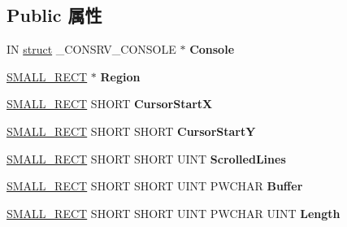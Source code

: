 \subsection*{Public 属性}
\begin{DoxyCompactItemize}
\item 
\mbox{\label{struct___f_r_o_n_t_e_n_d___v_t_b_l_aa908ac78a751065e23319e1109936856}} 
IN \hyperlink{interfacestruct}{struct} \+\_\+\+C\+O\+N\+S\+R\+V\+\_\+\+C\+O\+N\+S\+O\+LE $\ast$ {\bfseries Console}
\item 
\mbox{\label{struct___f_r_o_n_t_e_n_d___v_t_b_l_a7b7aa07ecf32b4bb2c6b5b0b5be18f39}} 
\hyperlink{structtag_s_m_a_l_l___r_e_c_t}{S\+M\+A\+L\+L\+\_\+\+R\+E\+CT} $\ast$ {\bfseries Region}
\item 
\mbox{\label{struct___f_r_o_n_t_e_n_d___v_t_b_l_af52ef7cd42e629e3d2b0e1985ceedd9b}} 
\hyperlink{structtag_s_m_a_l_l___r_e_c_t}{S\+M\+A\+L\+L\+\_\+\+R\+E\+CT} S\+H\+O\+RT {\bfseries Cursor\+StartX}
\item 
\mbox{\label{struct___f_r_o_n_t_e_n_d___v_t_b_l_ab8c4c69ddadcda0d1d1e006aee178dda}} 
\hyperlink{structtag_s_m_a_l_l___r_e_c_t}{S\+M\+A\+L\+L\+\_\+\+R\+E\+CT} S\+H\+O\+RT S\+H\+O\+RT {\bfseries Cursor\+StartY}
\item 
\mbox{\label{struct___f_r_o_n_t_e_n_d___v_t_b_l_a7602f4a26e47dffed7613a0df5854e4b}} 
\hyperlink{structtag_s_m_a_l_l___r_e_c_t}{S\+M\+A\+L\+L\+\_\+\+R\+E\+CT} S\+H\+O\+RT S\+H\+O\+RT U\+I\+NT {\bfseries Scrolled\+Lines}
\item 
\mbox{\label{struct___f_r_o_n_t_e_n_d___v_t_b_l_acdd7d63e85f3fd3c4899b73abbfc9687}} 
\hyperlink{structtag_s_m_a_l_l___r_e_c_t}{S\+M\+A\+L\+L\+\_\+\+R\+E\+CT} S\+H\+O\+RT S\+H\+O\+RT U\+I\+NT P\+W\+C\+H\+AR {\bfseries Buffer}
\item 
\mbox{\label{struct___f_r_o_n_t_e_n_d___v_t_b_l_a560803ceb230b5860b4cf55f6af7ec7e}} 
\hyperlink{structtag_s_m_a_l_l___r_e_c_t}{S\+M\+A\+L\+L\+\_\+\+R\+E\+CT} S\+H\+O\+RT S\+H\+O\+RT U\+I\+NT P\+W\+C\+H\+AR U\+I\+NT {\bfseries Length}

\end{DoxyCompactItemize}
